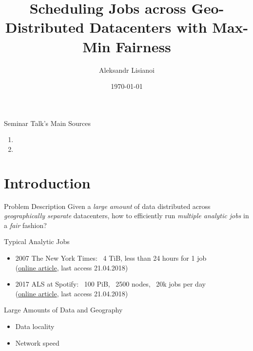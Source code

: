 \documentclass[presentation,professionalfonts]{beamer}
\institute[TU Wien]{Seminar ``\semname''\\\semester}
\date{\today}
\title[Scheduling Jobs with Max-Min Fairness]{Scheduling Jobs across Geo-Distributed Datacenters with Max-Min Fairness}
\author[Aleksandr Lisianoi]{Aleksandr Lisianoi}
\begin{document}
\maketitle

\begin{frame}{Seminar Talk's Main Sources}
  \begin{enumerate}
  \item {}
  \item {}
  \end{enumerate}
\end{frame}



\section{Introduction}

\begin{frame}{Problem Description}
    Given a \emph{large amount} of data distributed across
    \emph{geographically separate} datacenters, how to efficiently run
    \emph{multiple analytic jobs} in a \emph{fair} fashion?
\end{frame}

\begin{frame}{Typical Analytic Jobs}
  \begin{itemize}
  \item 2007 The New York Times: ~4 TiB, less than 24 hours for 1 job \\
    (\href{https://open.blogs.nytimes.com/2007/11/01/self-service-prorated-super-computing-fun/}{online article}, last access 21.04.2018)
  \item 2017 ALS at Spotify: ~100 PiB, ~2500 nodes, ~20k jobs per day \\
    (\href{https://labs.spotify.com/2017/10/16/big-data-processing-at-spotify-the-road-to-scio-part-1/}{online article}, last access 21.04.2018)
  \end{itemize}
\end{frame}

\begin{frame}{Large Amounts of Data and Geography}
  \begin{itemize}
  \item Data locality
  \item Network speed
  \end{itemize}
\end{frame}
\end{document}
